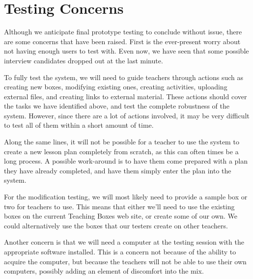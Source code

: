 \documentclass[12pt,titlepage]{article}
\begin{document}
\section{Testing Concerns}
Although we anticipate final prototype testing to conclude without issue, there are
some concerns that have been raised.  First is the ever-present worry about not
having enough users to test with.  Even now, we have seen that some possible
interview candidates dropped out at the last minute.

To fully test the system, we will need to guide teachers through actions such as
creating new boxes, modifying existing ones, creating activities, uploading external
files, and creating links to external material.  These actions should cover the
tasks we have identified above, and test the complete robustness of the system.
However, since there are a lot of actions involved, it may be very difficult to
test all of them within a short amount of time.

Along the same lines, it will not be possible for a teacher to use the system to
create a new lesson plan completely from scratch, as this can often times be a
long process.  A possible work-around is to have them come prepared with a plan
they have already completed, and have them simply enter the plan into the system.

For the modification testing, we will most likely need to provide a sample box or
two for teachers to use.  This means that either we'll need to use the existing
boxes on the current Teaching Boxes web site, or create some of our own.  We could
alternatively use the boxes that our testers create on other teachers.

Another concern is that we will need a computer at the testing session with the
appropriate software installed.  This is a concern not because of the ability
to acquire the computer, but because the teachers will not be able to use their
own computers, possibly adding an element of discomfort into the mix.
\end{document}
